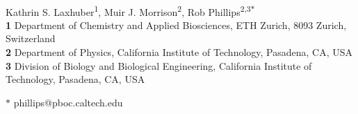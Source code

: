 \documentclass[10pt,letterpaper]{article}
\begin{document}
	\vspace*{0.2in}
	
	\begin{flushleft}
		{\Large
			\textbf{} %
		}
		\newline
		\\
		Kathrin S. Laxhuber\textsuperscript{1},
		Muir J. Morrison\textsuperscript{2},
		Rob Phillips\textsuperscript{2,3$\ast$}
		\\
		\bigskip
		\textbf{1} Department of Chemistry and Applied Biosciences, ETH Zurich, 8093 Zurich, Switzerland
		\\
		\textbf{2} Department of Physics, California Institute of Technology, Pasadena, CA, USA
		\\
		\textbf{3} Division of Biology and Biological Engineering, California Institute of Technology, Pasadena, CA, USA
		\\
		\bigskip
		
		
		
		
		$\ast$ phillips@pboc.caltech.edu
		
	\end{flushleft}
\end{document}
